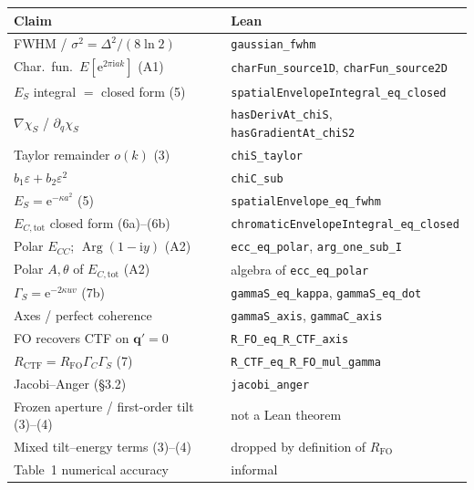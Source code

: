 \documentclass[11pt,a4paper]{article}
\theoremstyle{definition}
\theoremstyle{remark}
\DeclareMathOperator{\Arg}{Arg}
\newcommand{\ee}{\mathrm{e}}
\newcommand{\ii}{\mathrm{i}}
\newcommand{\ECtot}{E_{C,\mathrm{tot}}}
\newcommand{\ECC}{E_{CC}}
\newcommand{\RFO}{R_{\mathrm{FO}}}
\newcommand{\RCTF}{R_{\mathrm{CTF}}}
\begin{document}
\begin{center}
\small
\setlength{\tabcolsep}{4pt}
\begin{tabular}{@{}ll@{}}
\toprule
Claim & Lean \\
\midrule
FWHM / $\sigma^2=\Delta^2/(8\ln 2)$ & \texttt{gaussian\_fwhm} \\
Char.\ fun.\ $E[\ee^{2\pi\ii a k}]$ (A1) & \texttt{charFun\_source1D}, \texttt{charFun\_source2D} \\
$E_S$ integral $=$ closed form (5) & \texttt{spatialEnvelopeIntegral\_eq\_closed} \\
$\nabla\chi_S$ / $\partial_q\chi_S$ & \texttt{hasDerivAt\_chiS}, \texttt{hasGradientAt\_chiS2} \\
Taylor remainder $o(k)$ (3) & \texttt{chiS\_taylor} \\
$b_1\varepsilon+b_2\varepsilon^2$ & \texttt{chiC\_sub} \\
$E_S=\ee^{-\kappa a^2}$ (5) & \texttt{spatialEnvelope\_eq\_fwhm} \\
$\ECtot$ closed form (6a)--(6b) & \texttt{chromaticEnvelopeIntegral\_eq\_closed} \\
Polar $\ECC$; $\Arg(1-\ii y)$ (A2) & \texttt{ecc\_eq\_polar}, \texttt{arg\_one\_sub\_I} \\
Polar $A,\theta$ of $\ECtot$ (A2) & algebra of \texttt{ecc\_eq\_polar} \\
$\Gamma_S=\ee^{-2\kappa uv}$ (7b) & \texttt{gammaS\_eq\_kappa}, \texttt{gammaS\_eq\_dot} \\
Axes / perfect coherence & \texttt{gammaS\_axis}, \texttt{gammaC\_axis} \\
FO recovers CTF on $\mathbf{q}'=0$ & \texttt{R\_FO\_eq\_R\_CTF\_axis} \\
$\RCTF=\RFO\Gamma_C\Gamma_S$ (7) & \texttt{R\_CTF\_eq\_R\_FO\_mul\_gamma} \\
Jacobi--Anger (\S3.2) & \texttt{jacobi\_anger} \\
\midrule
Frozen aperture / first-order tilt (3)--(4) & not a Lean theorem \\
Mixed tilt--energy terms (3)--(4) & dropped by definition of $\RFO$ \\
Table~1 numerical accuracy & informal \\
\bottomrule
\end{tabular}
\end{center}
\end{document}
